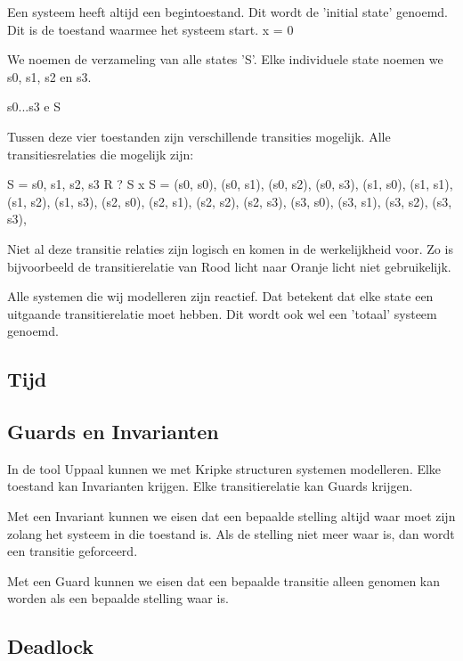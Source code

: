 \documentclass{article}
\begin{document}
		Een systeem heeft altijd een begintoestand. Dit wordt de 'initial state' genoemd. Dit is de toestand waarmee het systeem start. 
		x = 0

		We noemen de verzameling van alle states 'S'. Elke individuele state noemen we s0, s1, s2 en s3.

		s0...s3 e S

		Tussen deze vier toestanden zijn verschillende transities mogelijk. Alle transitiesrelaties die mogelijk zijn:

		S = {s0, s1, s2, s3}
		R ? S x S = {
			(s0, s0), (s0, s1), (s0, s2), (s0, s3),
			(s1, s0), (s1, s1), (s1, s2), (s1, s3),
			(s2, s0), (s2, s1), (s2, s2), (s2, s3),
			(s3, s0), (s3, s1), (s3, s2), (s3, s3),
		}

		Niet al deze transitie relaties zijn logisch en komen in de werkelijkheid voor. Zo is bijvoorbeeld de transitierelatie van Rood licht naar Oranje licht niet gebruikelijk.
		
		Alle systemen die wij modelleren zijn reactief. Dat betekent dat elke state een uitgaande transitierelatie moet hebben. Dit wordt ook wel een 'totaal' systeem genoemd.
		
		\subsection{Tijd}
		
		
		
		\subsection{Guards en Invarianten}
		
		In de tool Uppaal kunnen we met Kripke structuren systemen modelleren. Elke toestand kan Invarianten krijgen. Elke transitierelatie kan Guards krijgen.
		
		Met een Invariant kunnen we eisen dat een bepaalde stelling altijd waar moet zijn zolang het systeem in die toestand is. Als de stelling niet meer waar is, dan wordt een transitie geforceerd.

		Met een Guard kunnen we eisen dat een bepaalde transitie alleen genomen kan worden als een bepaalde stelling waar is.
		
		\subsection{Deadlock}
		
\end{document}
